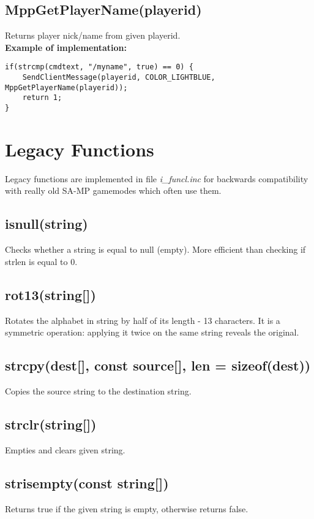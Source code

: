 \documentclass{article}
\begin{document}
\subsection{MppGetPlayerName(playerid)}
Returns player nick/name from given playerid.
\bigskip
\\\textbf{Example of implementation:}
\begin{verbatim}
if(strcmp(cmdtext, "/myname", true) == 0) {
    SendClientMessage(playerid, COLOR_LIGHTBLUE, MppGetPlayerName(playerid));
    return 1;
}
\end{verbatim}



\newpage
\section{Legacy Functions}
Legacy functions are implemented in file \textit{i\_funcl.inc} for backwards compatibility with really old SA-MP gamemodes which often use them.

\subsection{isnull(string)}
Checks whether a string is equal to null (empty). More efficient than checking if strlen is equal to 0.

\subsection{rot13(string[])}
Rotates the alphabet in string by half of its length - 13 characters. It is a symmetric operation: applying it twice on the same string reveals the original.

\subsection{strcpy(dest[], const source[], len = sizeof(dest))}
Copies the source string to the destination string.

\subsection{strclr(string[])}
Empties and clears given string.

\subsection{strisempty(const string[])}
Returns true if the given string is empty, otherwise returns false.
\end{document}
